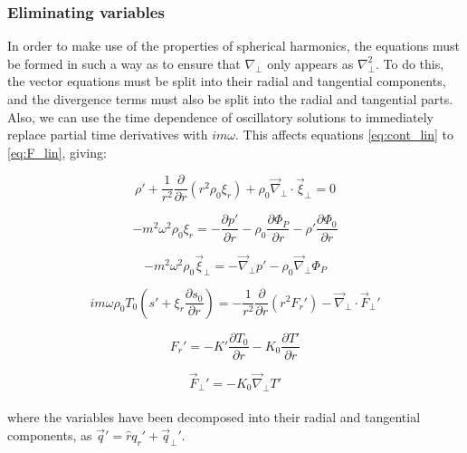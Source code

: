 \documentclass[11pt]{amsart}
\begin{document}
\subsubsection{Eliminating variables}

In order to make use of the properties of spherical harmonics, the equations must be formed in such a way as to ensure that
$\nabla_{\perp}$ only appears as $\nabla_{\perp}^{2}$.  To do this, the vector equations must be split into their radial and tangential components,
and the divergence terms must also be split into the radial and tangential parts.  Also, we can use the time dependence of oscillatory solutions to immediately
replace partial time derivatives with $i m \omega$.
This affects equations \ref{eq:cont_lin} to \ref{eq:F_lin}, giving:

\begin{equation} \label{eq:cont_split}
\rho' + \frac{1}{r^{2}} \frac{\partial}{\partial r} ( r^{2} \rho_{0} \xi_{r} ) + \rho_{0} \vec{\nabla}_{\perp} \cdot \vec{\xi}_{\perp} = 0
\end{equation}

\begin{equation} \label{eq:mom_split_rad}
- m^{2} \omega^{2} \rho_{0} \xi_{r} = - \frac{\partial p'}{\partial r} - \rho_{0} \frac{\partial \Phi_{P}}{\partial r} 
- \rho' \frac{\partial \Phi_{0}}{\partial r}
\end{equation}

\begin{equation} \label{eq:mom_split_tan}
- m^{2} \omega^{2} \rho_{0} \vec{\xi}_{\perp} = - \vec{\nabla}_{\perp} p' - \rho_{0} \vec{\nabla}_{\perp} \Phi_{P} 
\end{equation}

\begin{equation} \label{eq:E_split}
i m \omega \rho_{0} T_{0} \left( s' + \xi_{r} \frac{\partial s_{0}}{\partial r} \right)
= - \frac{1}{r^{2}} \frac{\partial}{\partial r} ( r^{2} F_{r}') - \vec{\nabla}_{\perp} \cdot \vec{F}_{\perp}'
\end{equation}

\begin{equation} \label{eq:F_split_rad}
F_{r}' = - K' \frac{\partial T_{0}}{\partial r} - K_{0} \frac{\partial T'}{\partial r}
\end{equation}

\begin{equation} \label{eq:F_split_tan}
\vec{F}_{\perp}' = - K_{0} \vec{\nabla}_{\perp} T'
\end{equation}
\\
where the variables have been decomposed into their radial and tangential components, as $\vec{q}' = \hat{r} q_{r}' + \vec{q}_{\perp}'$.
\end{document}
